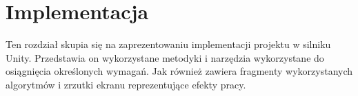 \chapter{Implementacja}
Ten rozdział skupia się na zaprezentowaniu implementacji projektu w silniku Unity.
Przedstawia on wykorzystane metodyki i narzędzia wykorzystane do osiągnięcia określonych wymagań.
Jak również zawiera fragmenty wykorzystanych algorytmów i zrzutki ekranu reprezentujące efekty pracy.

